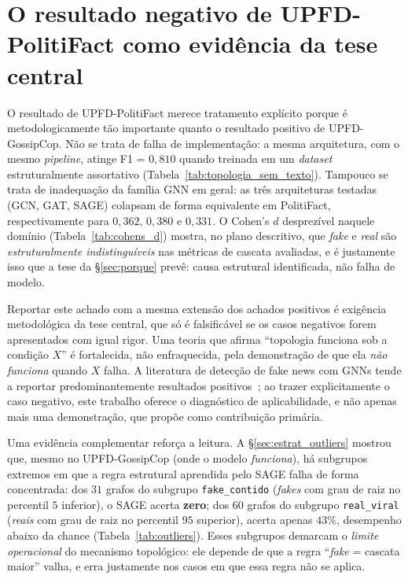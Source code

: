 \section{O resultado negativo de UPFD-PolitiFact como evid\^encia da tese central}
\label{sec:negativo}

O resultado de UPFD-PolitiFact merece tratamento expl\'icito porque \'e
metodologicamente t\~ao importante quanto o resultado positivo de
UPFD-GossipCop. N\~ao se trata de falha de implementa\c{c}\~ao: a
mesma arquitetura, com o mesmo \emph{pipeline}, atinge F1 = $0{,}810$
quando treinada em um \emph{dataset} estruturalmente assortativo
(Tabela~\ref{tab:topologia_sem_texto}). Tampouco se trata de
inadequa\c{c}\~ao da fam\'ilia GNN em geral: as tr\^es arquiteturas
testadas (GCN, GAT, SAGE) colapsam de forma equivalente em PolitiFact,
respectivamente para $0{,}362$, $0{,}380$ e $0{,}331$. O Cohen's $d$
desprez\'ivel naquele dom\'inio (Tabela~\ref{tab:cohens_d}) mostra, no
plano descritivo, que \emph{fake} e \emph{real} s\~ao
\emph{estruturalmente indistingu\'iveis} nas m\'etricas de cascata
avaliadas, e \'e justamente isso que a tese da \S\ref{sec:porque}
prev\^e: causa estrutural identificada, n\~ao falha de modelo.

Reportar este achado com a mesma extens\~ao dos achados positivos \'e exig\^encia
metodol\'ogica da tese central, que s\'o \'e falsific\'avel se os casos negativos
forem apresentados com igual rigor. Uma teoria que afirma
``topologia funciona sob a condi\c{c}\~ao $X$'' \'e fortalecida, n\~ao
enfraquecida, pela demonstra\c{c}\~ao de que ela \emph{n\~ao funciona}
quando $X$ falha. A literatura de detec\c{c}\~ao de fake news com GNNs
tende a reportar predominantemente resultados positivos~\cite{pmc_gnnsurveyfakenews, pmc_overviewfakenews}; ao trazer
explicitamente o caso negativo, este trabalho oferece o diagn\'ostico de
aplicabilidade, e n\~ao apenas mais uma demonstra\c{c}\~ao, que
prop\~oe como contribui\c{c}\~ao prim\'aria.

Uma evid\^encia complementar refor\c{c}a a leitura. A
\S\ref{sec:estrat_outliers} mostrou que, mesmo no UPFD-GossipCop (onde
o modelo \emph{funciona}), h\'a subgrupos extremos em que a regra
estrutural aprendida pelo SAGE falha de forma concentrada: dos $31$
grafos do subgrupo \texttt{fake\_contido} (\emph{fakes} com grau de raiz
no percentil $5$ inferior), o SAGE acerta \textbf{zero}; dos $60$ grafos
do subgrupo \texttt{real\_viral} (\emph{reais} com grau de raiz no
percentil $95$ superior), acerta apenas $43\%$, desempenho abaixo da
chance (Tabela~\ref{tab:outliers}). Esses subgrupos demarcam o
\emph{limite operacional} do mecanismo topol\'ogico: ele depende de
que a regra ``\emph{fake} = cascata maior'' valha, e erra justamente
nos casos em que essa regra n\~ao se aplica.

